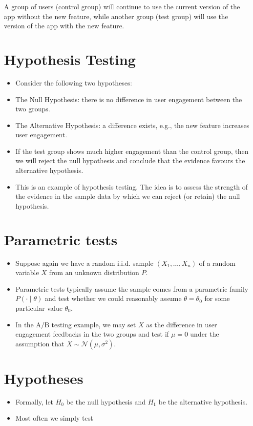 \documentclass[10pt]{article}
\begin{document}
A group of users (control group) will continue to use the current version of the app without the new feature, while another group (test group) will use the version of the app with the new feature.

\section*{Hypothesis Testing}
\begin{itemize}
  \item Consider the following two hypotheses:
  \item The Null Hypothesis: there is no difference in user engagement between the two groups.
  \item The Alternative Hypothesis: a difference exists, e.g., the new feature increases user engagement.
  \item If the test group shows much higher engagement than the control group, then we will reject the null hypothesis and conclude that the evidence favours the alternative hypothesis.
  \item This is an example of hypothesis testing. The idea is to assess the strength of the evidence in the sample data by which we can reject (or retain) the null hypothesis.
\end{itemize}

\section*{Parametric tests}
\begin{itemize}
  \item Suppose again we have a random i.i.d. sample $\left(X_{1}, \ldots, X_{n}\right)$ of a random variable $X$ from an unknown distribution $P$.
  \item Parametric tests typically assume the sample comes from a parametric family $P(\cdot \mid \theta)$ and test whether we could reasonably assume $\theta=\theta_{0}$ for some particular value $\theta_{0}$.
  \item In the $\mathrm{A} / \mathrm{B}$ testing example, we may set $X$ as the difference in user engagement feedbacks in the two groups and test if $\mu=0$ under the assumption that $X \sim \mathcal{N}\left(\mu, \sigma^{2}\right)$.
\end{itemize}

\section*{Hypotheses}
\begin{itemize}
  \item Formally, let $H_{0}$ be the null hypothesis and $H_{1}$ be the alternative hypothesis.
  \item Most often we simply test
\end{itemize}
\end{document}

